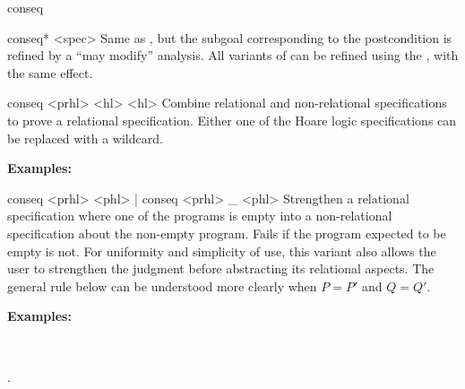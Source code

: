 \begin{tactic}{conseq}
  \begin{tsyntax}{conseq* <spec>}
  Same as , but the subgoal corresponding to the
  postcondition is refined by a ``may modify'' analysis. All variants
  of  can be refined using the \tct{*}, with the same
  effect.
  \end{tsyntax}

  \begin{tsyntax}{conseq <prhl> <hl> <hl>}
  Combine relational and non-relational specifications to prove a
  relational specification. Either one of the Hoare logic
  specifications can be replaced with a wildcard.

  \textbf{Examples:}
  \begin{mathpar}
    {}%
    \quad{}
  \end{mathpar}
  \end{tsyntax}

  \begin{tsyntax}{conseq <prhl> <phl> | conseq <prhl> _ <phl>}
  Strengthen a relational specification where one of the programs is
  empty into a non-relational specification about the non-empty
  program. Fails if the program expected to be empty is not. For
  uniformity and simplicity of use, this variant also allows the user
  to strengthen the \prhl judgment before abstracting its relational
  aspects. The general rule below can be understood more clearly when
  $P = P'$ and $Q = Q'$.

  \textbf{Examples:}
  \begin{mathpar}
    {}%
    \quad{} \\
    {}%
    \quad{}
  \end{mathpar}
  \end{tsyntax}


  .
\end{tactic}
